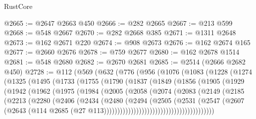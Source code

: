 \begin{lexlean}{RustCore}
\begin{coremodule}
@2665 := @2647 @2663 @450
@2666 := @282 @2665
@2667 := @213 @599
@2668 := @548 @2667
@2670 := @282 @2668 @385
@2671 := @1311 @2648
@2673 := @162 @2671 @220
@2674 := @908 @2673
@2676 := @162 @2674 @165
@2677 := @2660 @2676
@2678 := @759 @2677
@2680 := @162 @2678 @1514
@2681 := @548 @2680
@2682 := @2670 @2681
@2685 := @2514 (@2666 @2682 @450)
@2728 := @112
    (@569
      (@632
        (@776
          (@956
            (@1076
              (@1083
                (@1228
                  (@1274
                    (@1325
                      (@1495
                        (@1733
                          (@1755
                            (@1790
                              (@1837
                                (@1849
                                  (@1856
                                    (@1905
                                      (@1929
                                        (@1942
                                          (@1962
                                            (@1975
                                              (@1984
                                                (@2005
                                                  (@2058
                                                    (@2074
                                                      (@2083
                                                        (@2149
                                                          (@2185
                                                            (@2213
                                                              (@2280
                                                                (@2406
                                                                  (@2434
                                                                    (@2480
                                                                      (@2494
                                                                        (@2505
                                                                          (@2531
                                                                            (@2547
                                                                              (@2607
                                                                                (@2643
                                                                                  (@114
                                                                                    @2685
                                                                                    (@27
                                                                                      @113)))))))))))))))))))))))))))))))))))))))))

\end{coremodule}
\end{lexlean}

